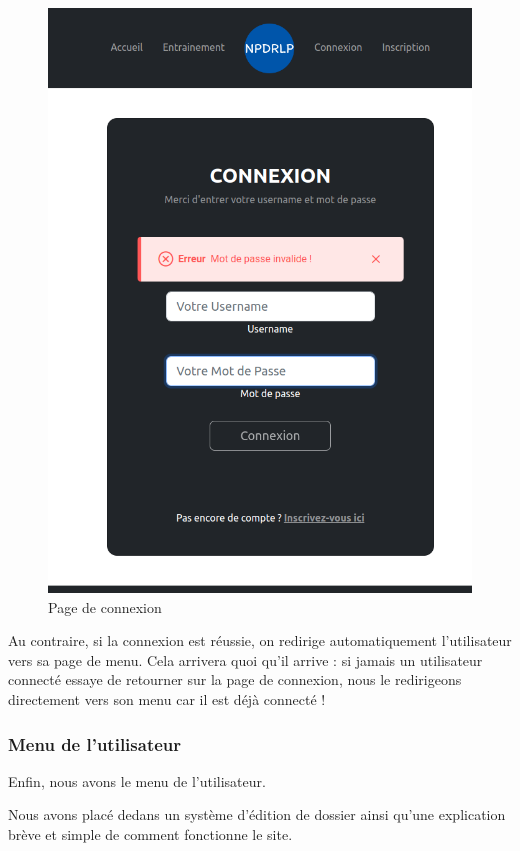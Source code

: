 \documentclass[12pt,french]{article}
\begin{document}
\begin{figure}[H]
\begin{minipage}{.5\textwidth}
		\includegraphics[scale=0.25]{connec2.png}
	\end{minipage}
	\caption{Page de connexion}
\end{figure}

Au contraire, si la connexion est réussie, on redirige automatiquement l'utilisateur vers sa page de menu. Cela arrivera quoi qu'il arrive : si jamais un utilisateur connecté essaye de retourner sur la page de connexion, nous le redirigeons directement vers son menu car il est déjà connecté !

\subsubsection{Menu de l'utilisateur}

Enfin, nous avons le menu de l'utilisateur.

Nous avons placé dedans un système d'édition de dossier ainsi qu'une explication brève et simple de comment fonctionne le site.
\end{document}
